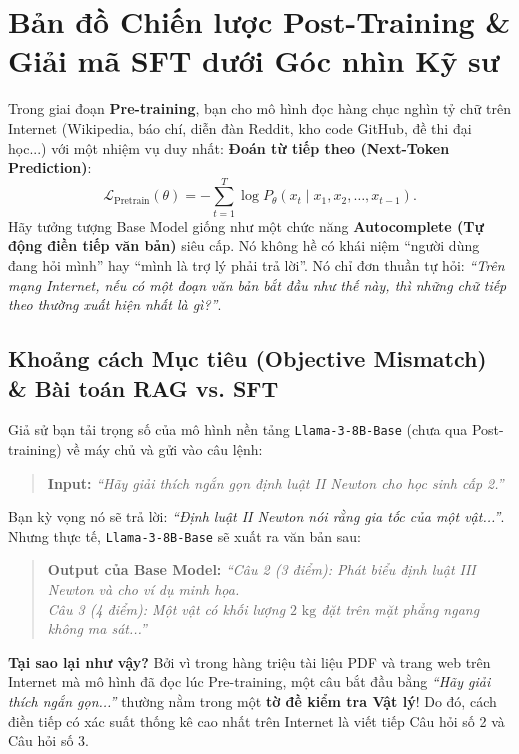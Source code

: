 \chapter{Bản đồ Chiến lược Post-Training \& Giải mã SFT dưới Góc nhìn Kỹ sư}
\label{chap:sft_eng}
\label{ch:sft}

\begin{mentalmodel}
Trong giai đoạn \textbf{Pre-training}, bạn cho mô hình đọc hàng chục nghìn tỷ chữ trên Internet (Wikipedia, báo chí, diễn đàn Reddit, kho code GitHub, đề thi đại học...) với một nhiệm vụ duy nhất: \textbf{Đoán từ tiếp theo (Next-Token Prediction)}:
\begin{equation}
    \mathcal{L}_{\text{Pretrain}}(\theta) = -\sum_{t=1}^{T} \log P_\theta(x_t \mid x_1, x_2, \dots, x_{t-1}).
    \label{eq:pretrain_loss_eng}
\end{equation}
Hãy tưởng tượng Base Model giống như một chức năng \textbf{Autocomplete (Tự động điền tiếp văn bản)} siêu cấp. Nó không hề có khái niệm ``người dùng đang hỏi mình'' hay ``mình là trợ lý phải trả lời''. Nó chỉ đơn thuần tự hỏi: \textit{``Trên mạng Internet, nếu có một đoạn văn bản bắt đầu như thế này, thì những chữ tiếp theo thường xuất hiện nhất là gì?''}.
\end{mentalmodel}

\section{Khoảng cách Mục tiêu (Objective Mismatch) \& Bài toán RAG vs. SFT}
\label{sec:mismatch_rag_vs_sft}

\begin{caseexample}
Giả sử bạn tải trọng số của mô hình nền tảng \texttt{Llama-3-8B-Base} (chưa qua Post-training) về máy chủ và gửi vào câu lệnh:
\begin{quote}
\textbf{Input:} \textit{``Hãy giải thích ngắn gọn định luật II Newton cho học sinh cấp 2.''}
\end{quote}
Bạn kỳ vọng nó sẽ trả lời: \textit{``Định luật II Newton nói rằng gia tốc của một vật...''}. Nhưng thực tế, \texttt{Llama-3-8B-Base} sẽ xuất ra văn bản sau:
\begin{quote}
\textbf{Output của Base Model:}
\textit{``Câu 2 (3 điểm): Phát biểu định luật III Newton và cho ví dụ minh họa.\\
Câu 3 (4 điểm): Một vật có khối lượng $2\text{ kg}$ đặt trên mặt phẳng ngang không ma sát...''}
\end{quote}
\textbf{Tại sao lại như vậy?} Bởi vì trong hàng triệu tài liệu PDF và trang web trên Internet mà mô hình đã đọc lúc Pre-training, một câu bắt đầu bằng \textit{``Hãy giải thích ngắn gọn...''} thường nằm trong một \textbf{tờ đề kiểm tra Vật lý}! Do đó, cách điền tiếp có xác suất thống kê cao nhất trên Internet là viết tiếp Câu hỏi số 2 và Câu hỏi số 3.
\end{caseexample}

